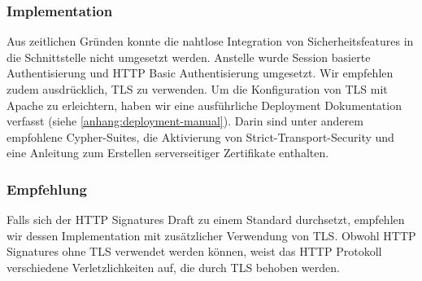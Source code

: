 \subsubsection{Implementation} Aus zeitlichen Gründen konnte die nahtlose Integration von Sicherheitsfeatures in die Schnittstelle nicht umgesetzt werden. Anstelle wurde Session basierte Authentisierung und HTTP Basic Authentisierung umgesetzt. Wir
empfehlen zudem ausdrücklich, TLS zu verwenden. Um die Konfiguration von TLS mit
Apache zu erleichtern, haben wir eine ausführliche Deployment Dokumentation
verfasst (siehe \ref{anhang:deployment-manual}). Darin sind unter anderem
empfohlene Cypher-Suites, die Aktivierung von Strict-Transport-Security und eine
Anleitung zum Erstellen serverseitiger Zertifikate enthalten.

\subsubsection{Empfehlung} Falls sich der HTTP Signatures Draft zu einem Standard durchsetzt, empfehlen wir dessen Implementation mit zusätzlicher Verwendung von TLS. Obwohl HTTP Signatures ohne TLS verwendet werden können, weist das HTTP Protokoll verschiedene Verletzlichkeiten\cite{httpsecconsiderations2014} auf, die durch TLS behoben werden.
